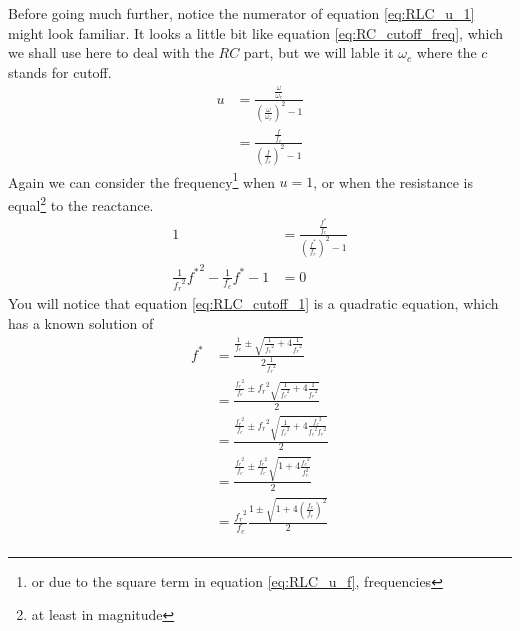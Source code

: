 Before going much further, notice the numerator of equation \ref{eq:RLC_u_1} might
look familiar. It looks a little bit like equation \ref{eq:RC_cutoff_freq}, which we
shall use here to deal with the $RC$ part, but we will lable it $\omega_c$ where
 the $c$ stands for cutoff.
\begin{align}
    u &= \frac{\frac{\omega}{\omega_c}}{\left(\frac{\omega}{\omega_r}\right)^2 -1} \nonumber \\
      &= \frac{\frac{f}{f_c}}{\left(\frac{f}{f_r}\right)^2 -1}\label{eq:RLC_u_f}
\end{align}
Again we can consider the frequency\footnote{or due to the square term in equation \ref{eq:RLC_u_f}, frequencies}
when $u=1$, or when the resistance is equal\footnote{at least in magnitude} to the reactance.
\begin{align}
    1 &= \frac{\frac{f^*}{f_c}}{\left(\frac{f^*}{f_r}\right)^2 -1}\nonumber \\
    \frac{1}{{f_{r}}^2} {f^*}^2 - \frac{1}{f_c} f^* -1 & = 0 \label{eq:RLC_cutoff_1}
\end{align}
You will notice that equation \ref{eq:RLC_cutoff_1} is a quadratic equation,
which has a known solution of
\begin{align}
    f^* &= \frac{\frac{1}{f_c} \pm \sqrt{\frac{1}{{f_c}^2}+4\frac{1}{{f_{r}}^2}}}{2\frac{1}{{f_{r}}^2}} \nonumber \\
    &= \frac{\frac{{f_{r}}^2}{f_c} \pm {f_{r}}^2 \sqrt{\frac{1}{{f_c}^2}+4\frac{1}{{f_{r}}^2}}}{2}\nonumber \\
    &= \frac{\frac{{f_{r}}^2}{f_c} \pm {f_{r}}^2 \sqrt{\frac{1}{{f_c}^2}+4\frac{{f_c}^2}{{f_c}^2{f_{r}}^2}}}{2} \nonumber \\
    &= \frac{\frac{{f_{r}}^2}{f_c} \pm \frac{{f_{r}}^2}{f_c} \sqrt{1+4\frac{{f_c}^2}{f_{r}^2}}}{2}\nonumber \\
    &= \frac{{f_{r}}^2}{f_c} \frac{ 1 \pm \sqrt{1+4\left(\frac{f_c}{f_r}\right)^2}}{2}\nonumber \\
\end{align}
